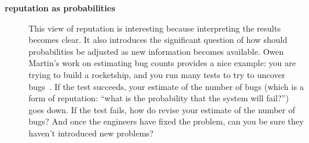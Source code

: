 \begin{description}
\item[\textbf{reputation as probabilities}]  This view of reputation is
    interesting because interpreting the results becomes clear.
    It also introduces the significant question of how should probabilities
    be adjusted as new information becomes available.
    Owen Martin's work on estimating bug counts provides a nice example:
    you are trying to build a rocketship, and you run many
    tests to try to uncover bugs~\cite{Martin2011}.
    If the test succeeds, your estimate
    of the number of bugs (which is a form of reputation: ``what is
    the probability that the system will fail?'') goes down.
    If the test fails, how do revise your estimate of the number
    of bugs?  And once the engineers have fixed the problem, can
    you be sure they haven't introduced new problems?

\end{description}

